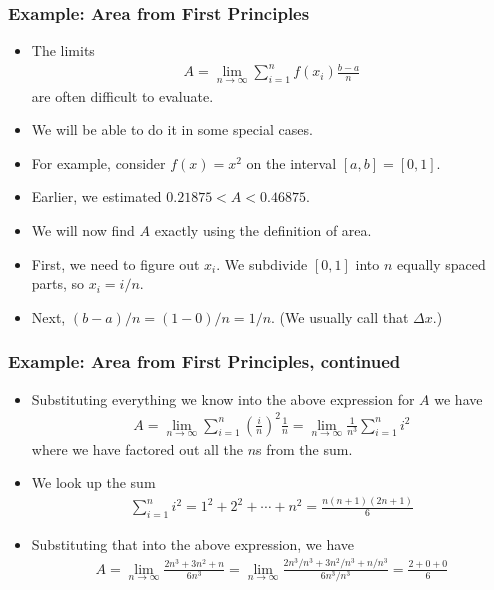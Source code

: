 \documentclass[serif,ignorenonframetext]{beamer}
\begin{document}
\begin{frame}
  \frametitle{Example: Area from First Principles}
  \begin{itemize}[<+->]
  \item The limits
    \begin{align*}
      A = \lim_{n\to\infty} \sum_{i=1}^{n} f(x_{i}) \frac{b-a}{n}
    \end{align*}
    are often difficult to evaluate.
  \item We will be able to do it in some special cases.
  \item For example, consider $f(x)=x^2$ on the interval $[a,b]=[0,1]$.
  \item Earlier, we estimated $0.21875<A<0.46875$.
  \item We will now find $A$ exactly using the definition of area.
  \item First, we need to figure out $x_i$.  We subdivide $[0,1]$ into 
    $n$ equally spaced parts, so $x_i=i/n$.
  \item Next, $(b-a)/n=(1-0)/n=1/n$.  (We usually call that $\Delta x$.)
  \end{itemize}
\end{frame}


\begin{frame}
  \frametitle{Example: Area from First Principles, continued}
  \begin{itemize}[<+->]
  \item Substituting everything we know into the above expression for $A$
    we have
    \begin{align*}
      A = \lim_{n\to\infty} \sum_{i=1}^{n} \left(\frac{i}{n}\right)^2\frac{1}{n}
      = \lim_{n\to\infty} \frac{1}{n^3} \sum_{i=1}^{n} i^2
    \end{align*}
    where we have factored out all the $n$s from the sum.
  \item We look up the sum 
    \begin{align*}
      \sum_{i=1}^n i^2 
      = 1^2 + 2^2 + \cdots + n^2
      = \frac{n(n+1)(2n+1)}{6}
    \end{align*}
  \item Substituting that into the above expression, we have
    \begin{align*}
      A = \lim_{n\to\infty} \frac{2n^3+3n^2+n}{6n^3} 
      = \lim_{n\to\infty} \frac{2n^3/n^3+3n^2/n^3+n/n^3}{6n^3/n^3} 
      = \frac{2+0+0}{6}
    \end{align*}
  \end{itemize}
\end{frame}
\end{document}
